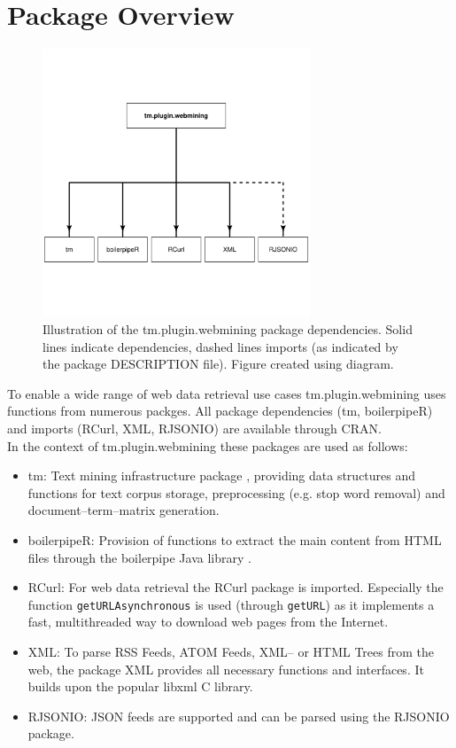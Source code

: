\documentclass[a4paper]{article}
\let\code=\texttt
\newcommand{\pkg}[1]{{\normalfont\fontseries{b}\selectfont #1}}
\newcommand{\proglang}[1]{\textsf{#1}}
\newcommand{\fkt}[1]{\code{#1}}
\begin{document}
\section{Package Overview}
\begin{figure}[tbp]
\centering
\includegraphics[width = 8cm]{figures/dependenceplot}
\caption{	Illustration of the \pkg{tm.plugin.webmining} package dependencies. Solid lines 
			indicate dependencies, dashed lines imports (as indicated by the package DESCRIPTION file).
			Figure created using \pkg{diagram}.
}
\label{fig:schema_tm.plugin.webmining}
\end{figure}

To enable a wide range of web data retrieval use cases \pkg{tm.plugin.webmining} uses functions
from numerous packges. All package dependencies (\pkg{tm}, \pkg{boilerpipeR}) and imports 
(\pkg{RCurl}, \pkg{XML}, \pkg{RJSONIO}) are available through \proglang{CRAN}.\\
In the context of \pkg{tm.plugin.webmining} these packages are used as follows:

\begin{itemize}
\item \pkg{tm}: Text mining infrastructure package \citep{hornik:Feinerer+Hornik+Meyer:2008}, 
	providing data structures and functions for text corpus storage, preprocessing (e.g. stop word removal)
	and document--term--matrix generation. 
\item \pkg{boilerpipeR}: Provision of functions to extract the main content from \proglang{HTML} files
	through the boilerpipe \proglang{Java} library \citep{kohlschuetter:webextract}.
\item \pkg{RCurl}: For web data retrieval the \pkg{RCurl} package is imported.
	Especially the function \fkt{getURLAsynchronous} is used (through \fkt{getURL})
	as it implements a fast, multithreaded way to download web pages from the Internet.
\item \pkg{XML}: To parse \proglang{RSS} Feeds, \proglang{ATOM} Feeds, \proglang{XML}-- or \proglang{HTML}
	Trees from the web, the package \pkg{XML} \citep{RPack:XML} provides all
	necessary functions and interfaces. It builds upon the popular \pkg{libxml}
	\proglang{C} library.
\item \pkg{RJSONIO}: \proglang{JSON} feeds are supported and can be
parsed using the \pkg{RJSONIO} package.
\end{itemize}
\end{document}
